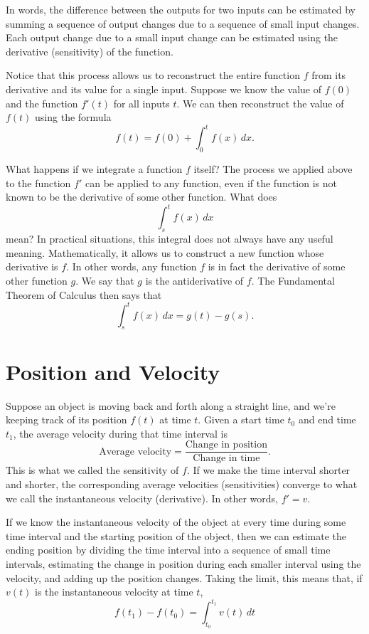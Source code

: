 \documentclass{math-deane}
\begin{document}
In words, the difference between the outputs for two inputs can be estimated by summing a sequence of output changes due to a sequence of small input changes. Each output change due to a small input change can be estimated using the derivative (sensitivity) of the function.

Notice that this process allows us to reconstruct the entire function $f$ from its derivative and its value for a single input. Suppose we know the value of $f(0)$ and the function $f'(t)$ for all inputs $t$. We can then reconstruct the value of $f(t)$ using the formula
\[
f(t) = f(0) + \int_0^t f(x)\,dx.
\]

What happens if we integrate a function $f$ itself? The process we applied above to the function $f'$ can be applied to any function, even if the function is not known to be the derivative of some other function. What does
\[
\int_s^t f(x)\,dx
\]
mean? In practical situations, this integral does not always have any useful meaning. Mathematically, it allows us to construct a new function whose derivative is $f$. In other words, any function $f$ is in fact the derivative of some other function $g$. We say that $g$ is the antiderivative of $f$. The Fundamental Theorem of Calculus then says that
\[
\int_s^t f(x)\,dx = g(t) - g(s).
\]

\section{Position and Velocity}

Suppose an object is moving back and forth along a straight line, and we're keeping track of its position $f(t)$ at time $t$. Given a start time $t_0$ and end time $t_1$, the average velocity during that time interval is
\[
\text{Average velocity} = \frac{\text{Change in position}}{\text{Change in time}}.
\]
This is what we called the sensitivity of $f$. If we make the time interval shorter and shorter, the corresponding average velocities (sensitivities) converge to what we call the instantaneous velocity (derivative). In other words, $f' = v$.

If we know the instantaneous velocity of the object at every time during some time interval and the starting position of the object, then we can estimate the ending position by dividing the time interval into a sequence of small time intervals, estimating the change in position during each smaller interval using the velocity, and adding up the position changes. Taking the limit, this means that, if $v(t)$ is the instantaneous velocity at time $t$, 
\[
f(t_1) - f(t_0) = \int_{t_0}^{t_1} v(t)\,dt
\]
\end{document}

